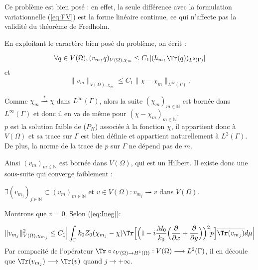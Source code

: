Ce problème est bien posé : en effet, la seule différence avec la formulation variationnelle (\ref{eq:FV}) est la forme linéaire continue, ce qui n'affecte pas la validité du théorème de Fredholm.

En exploitant le caractère bien posé du problème, on écrit \cite{3} :

\begin{equation}
\label{eq:Ineg}
\forall q\in V(\Omega), (v_m, q )_{V(\Omega),\chi_m} \leq C_1 |(h_m, \Tr(q))_{L^2(\Gamma)}|
\end{equation}
et
\begin{equation}
\lVert v_m \rVert_{V(\Omega),\chi_m} 
\leq C_1  \lVert \chi - \chi_m \rVert_{L^\infty(\Gamma)} .
\end{equation}


Comme $\chi_m \stackrel{\ast}{\rightharpoonup} \chi$ dans $L^\infty(\Gamma)$, alors la suite $(\chi_m)_{m \in \mathbb{N}}$ est bornée dans $L^\infty(\Gamma)$ et donc il en va de même pour $(\chi - \chi_m)_{m \in \mathbb{N}}$.\\

\( p \) est la solution faible de ($P_H$) associée à la fonction \( \chi \), il appartient donc à \( V(\Omega) \) et sa trace sur \( \Gamma \) est bien définie et appartient naturellement à \( L^2(\Gamma) \). De plus, la norme de la trace de \( p \) sur \( \Gamma \) ne dépend pas de \( m \).


Ainsi $(v_m)_{m \in \mathbb{N}}$ est bornée dans $V(\Omega)$, qui est un Hilbert. Il existe donc une sous-suite qui converge faiblement : 
\begin{center}
    $\exists (v_{m_j})_{j \in \mathbb{N}} \subset (v_m)_{m \in \mathbb{N}}$ et $v \in V(\Omega) : v_{m_j} \rightharpoonup v$ dans $V(\Omega)$.
\end{center}

Montrons que $v = 0$. Selon (\ref{eq:Ineg}):

\begin{equation}
\begin{aligned}
\lVert v_{m_j} \rVert^2_{V(\Omega),\chi_{m_j}}\leq C_1 \Big|\int_{\Gamma} k_0Z_0(\chi_{m_j} - \chi)\Tr \Bigl[ \Bigl(1-i \frac{M_0}{k_0} \Big(\frac{\partial}{\partial x} + \frac{\partial}{\partial y}\Big) \Bigr)^2p \Bigr] \overline{\Tr(v_{m_j})}d\mu\Big|
\end{aligned}
\end{equation}
Par compacité de l'opérateur  $\Tr \circ \iota_{V(\Omega)\to H^1(\Omega)}: V(\Omega) \longrightarrow  L^2(\Gamma)$, il en découle que $\Tr(v_{m_j}) \longrightarrow \Tr(v)$ quand $j \longrightarrow +\infty$. \\

